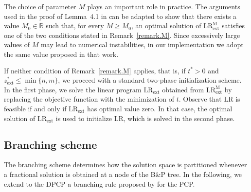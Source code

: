 \documentclass[preprint, 11pt, authoryear]{elsarticle}
\newcommand{\setcoveringformLR}{\text{LR}}
\newcommand{\setcoveringformLRM}{\text{LR}^{\text{M}}_{\text{ext}}}
\newcommand{\setcoveringformLRext}{\text{LR}_{\text{ext}}}
\begin{document}
The choice of parameter $M$ plays an important role in practice. The arguments used in the proof of Lemma~4.1 in \cite{Lucci2024} can be adapted to show that there exists a value $M_0 \in \mathbb{R}$ such that, for every $M \ge M_0$, an optimal solution of $\setcoveringformLRM$ satisfies one of the two conditions stated in Remark~\ref{remark.M}. Since excessively large values of $M$ may lead to numerical instabilities, in our implementation we adopt the same value proposed in that work.

If neither condition of Remark~\ref{remark.M} applies, that is, if $t^* > 0$ and $z^*_{\mathrm{ext}} \leq \min\{n,m\}$, we proceed with a standard two-phase initialization scheme.
In the first phase, we solve the linear program $\setcoveringformLRext$ 
obtained from $\setcoveringformLRM$ by replacing the objective function with the minimization of $t$.
Observe that $\setcoveringformLR$ is feasible if and only if $\setcoveringformLRext$ has optimal value zero.
In that case, the optimal solution of $\setcoveringformLRext$ is used to initialize $\setcoveringformLR$, which is solved in the second phase.

\subsection{Branching scheme}\label{subsec:branching}

The branching scheme determines how the solution space is partitioned whenever a fractional solution is obtained at a node of the B\&P tree. 
In the following, 
we extend to the DPCP a branching rule proposed by \cite{Furini2018} for the PCP. 

\end{document}
